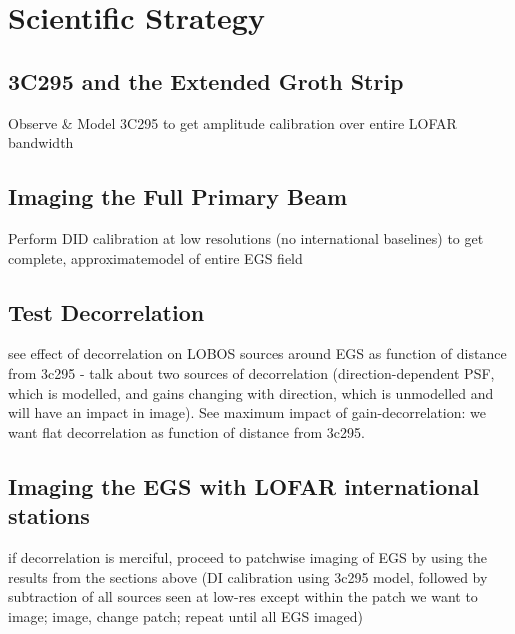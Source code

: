 \chapter{Scientific Strategy}

\section{3C295 and the Extended Groth Strip}

\pg
Observe \& Model 3C295 to get amplitude calibration over entire LOFAR bandwidth


\section{Imaging the Full Primary Beam}
\pg
Perform DID calibration at low resolutions (no international baselines) to get complete, approximatemodel of entire EGS field

\section{Test Decorrelation}
\pg
see effect of decorrelation on LOBOS sources around EGS as function of distance from 3c295 - talk about two sources of decorrelation (direction-dependent PSF, which is modelled, and gains changing with direction, which is unmodelled and will have an impact in image). See maximum impact of gain-decorrelation: we want flat decorrelation as function of distance from 3c295.

\section{Imaging the EGS with LOFAR international stations}
\pg
if decorrelation is merciful, proceed to patchwise imaging of EGS by using the results from the sections above (DI calibration using 3c295 model, followed by subtraction of all sources seen at low-res except within the patch we want to image; image, change patch; repeat until all EGS imaged)

\newpage
